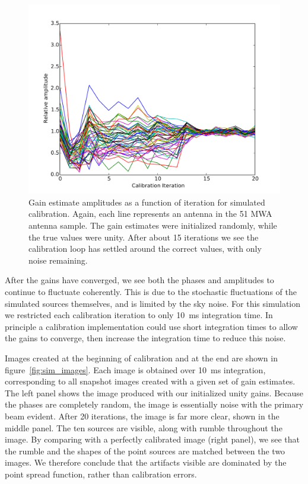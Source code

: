\documentclass[a4paper,fleqn,usenatbib]{mnras}
\begin{document}
\begin{figure}
\begin{center}
\includegraphics[width=\columnwidth]{fig4.pdf}
\caption{Gain estimate amplitudes as a function of iteration for simulated calibration. Again, 
each line represents an antenna in the 51 MWA antenna sample. The gain estimates were 
initialized randomly, while the true values were unity. After about 15 iterations we see the 
calibration loop has settled around the correct values, with only noise remaining.}
\label{fig:sim_amp}
\end{center}
\end{figure}

After the gains have converged, we see both the phases and amplitudes to continue to 
fluctuate coherently. This is due to the stochastic fluctuations of the simulated sources 
themselves, and is limited by the sky noise. For this simulation we restricted each calibration 
iteration to only 10~ms integration time. In principle a calibration implementation could use 
short integration times to allow the gains to converge, then increase the integration time to 
reduce this noise.

Images created at the beginning of calibration and at the end are shown in 
figure~\ref{fig:sim_images}. Each image is obtained over 10~ms integration, corresponding to 
all snapshot images created with a given set of gain estimates. The left panel shows the image 
produced with our initialized unity gains. Because the phases are completely random, the 
image is essentially noise with the primary beam evident. After 20 iterations, the image is far 
more clear, shown in the middle panel. 
The ten sources are visible, along with rumble throughout the image. By comparing with
a perfectly calibrated image (right panel), we see that the rumble and the shapes of the
point sources are matched between the two images. We therefore conclude that the 
artifacts visible are dominated by the point spread function, rather than calibration errors.
\end{document}

